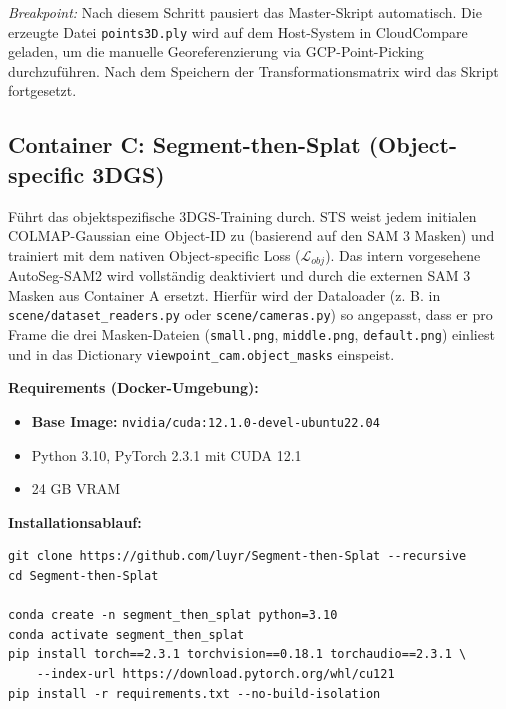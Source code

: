 \documentclass[12pt,a4paper]{article}
\begin{document}
\textit{Breakpoint:} Nach diesem Schritt pausiert das Master-Skript automatisch. Die erzeugte Datei \texttt{points3D.ply} wird auf dem Host-System in CloudCompare geladen, um die manuelle Georeferenzierung via GCP-Point-Picking durchzuführen. Nach dem Speichern der Transformationsmatrix wird das Skript fortgesetzt.

\subsection*{Container C: Segment-then-Splat (Object-specific 3DGS)}
Führt das objektspezifische 3DGS-Training durch. STS weist jedem initialen COLMAP-Gaussian eine Object-ID zu (basierend auf den SAM 3 Masken) und trainiert mit dem nativen Object-specific Loss ($\mathcal{L}_{obj}$). Das intern vorgesehene AutoSeg-SAM2 wird vollständig deaktiviert und durch die externen SAM 3 Masken aus Container A ersetzt. Hierfür wird der Dataloader (z. B. in \texttt{scene/dataset\_readers.py} oder \texttt{scene/cameras.py}) so angepasst, dass er pro Frame die drei Masken-Dateien (\texttt{small.png}, \texttt{middle.png}, \texttt{default.png}) einliest und in das Dictionary \texttt{viewpoint\_cam.object\_masks} einspeist.

\textbf{Requirements (Docker-Umgebung):}
\begin{itemize}[noitemsep]
    \item \textbf{Base Image:} \texttt{nvidia/cuda:12.1.0-devel-ubuntu22.04}
    \item Python 3.10, PyTorch 2.3.1 mit CUDA 12.1
    \item 24 GB VRAM
\end{itemize}

\textbf{Installationsablauf:}
\begin{verbatim}
git clone https://github.com/luyr/Segment-then-Splat --recursive
cd Segment-then-Splat

conda create -n segment_then_splat python=3.10
conda activate segment_then_splat
pip install torch==2.3.1 torchvision==0.18.1 torchaudio==2.3.1 \
    --index-url https://download.pytorch.org/whl/cu121
pip install -r requirements.txt --no-build-isolation
\end{verbatim}
\end{document}
